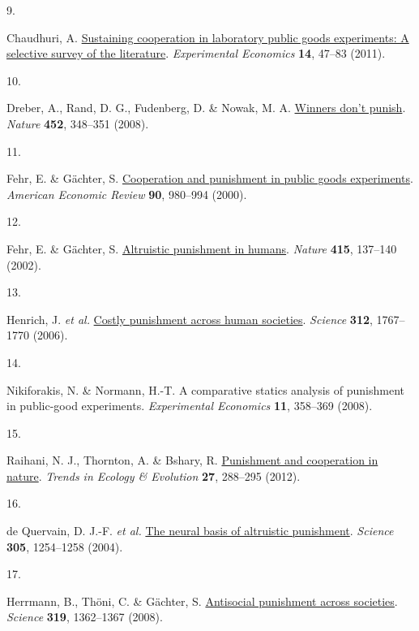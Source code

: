 \documentclass[
  man,floatsintext]{apa6}
\newlength{\cslhangindent}
\newlength{\csllabelwidth}
\newlength{\cslentryspacingunit} %
\newenvironment{CSLReferences}[2] %
 {%
  \setlength{\parindent}{0pt}
  \ifodd #1
  \let\oldpar\par
  \def\par{\hangindent=\cslhangindent\oldpar}
  \fi
  \setlength{\parskip}{#2\cslentryspacingunit}
 }%
 {}
\newcommand{\CSLLeftMargin}[1]{\parbox[t]{\csllabelwidth}{#1}}
\newcommand{\CSLRightInline}[1]{\parbox[t]{\linewidth - \csllabelwidth}{#1}\break}
\begin{document}
\begin{CSLReferences}{0}{0}
\leavevmode{}%
\CSLLeftMargin{9. }%
\CSLRightInline{Chaudhuri, A. \href{https://doi.org/10.1007/s10683-010-9257-1}{Sustaining cooperation in laboratory public goods experiments: A selective survey of the literature}. \emph{Experimental Economics} \textbf{14}, 47--83 (2011).}

\leavevmode{}%
\CSLLeftMargin{10. }%
\CSLRightInline{Dreber, A., Rand, D. G., Fudenberg, D. \& Nowak, M. A. \href{https://doi.org/10.1038/nature06723}{Winners don't punish}. \emph{Nature} \textbf{452}, 348--351 (2008).}

\leavevmode{}%
\CSLLeftMargin{11. }%
\CSLRightInline{Fehr, E. \& Gächter, S. \href{https://www.jstor.org/stable/117319}{Cooperation and punishment in public goods experiments}. \emph{American Economic Review} \textbf{90}, 980--994 (2000).}

\leavevmode{}%
\CSLLeftMargin{12. }%
\CSLRightInline{Fehr, E. \& Gächter, S. \href{https://doi.org/10.1038/415137a}{Altruistic punishment in humans}. \emph{Nature} \textbf{415}, 137--140 (2002).}

\leavevmode{}%
\CSLLeftMargin{13. }%
\CSLRightInline{Henrich, J. \emph{et al.} \href{https://doi.org/10.1126/science.1127333}{Costly punishment across human societies}. \emph{Science} \textbf{312}, 1767--1770 (2006).}

\leavevmode{}%
\CSLLeftMargin{14. }%
\CSLRightInline{Nikiforakis, N. \& Normann, H.-T. A comparative statics analysis of punishment in public-good experiments. \emph{Experimental Economics} \textbf{11}, 358--369 (2008).}

\leavevmode{}%
\CSLLeftMargin{15. }%
\CSLRightInline{Raihani, N. J., Thornton, A. \& Bshary, R. \href{https://doi.org/10.1016/j.tree.2011.12.004}{Punishment and cooperation in nature}. \emph{Trends in Ecology \& Evolution} \textbf{27}, 288--295 (2012).}

\leavevmode{}%
\CSLLeftMargin{16. }%
\CSLRightInline{de Quervain, D. J.-F. \emph{et al.} \href{https://doi.org/10.1126/science.1100735}{The neural basis of altruistic punishment}. \emph{Science} \textbf{305}, 1254--1258 (2004).}

\leavevmode{}%
\CSLLeftMargin{17. }%
\CSLRightInline{Herrmann, B., Thöni, C. \& Gächter, S. \href{https://doi.org/10.1126/science.1153808}{Antisocial punishment across societies}. \emph{Science} \textbf{319}, 1362--1367 (2008).}


\end{CSLReferences}
\end{document}
